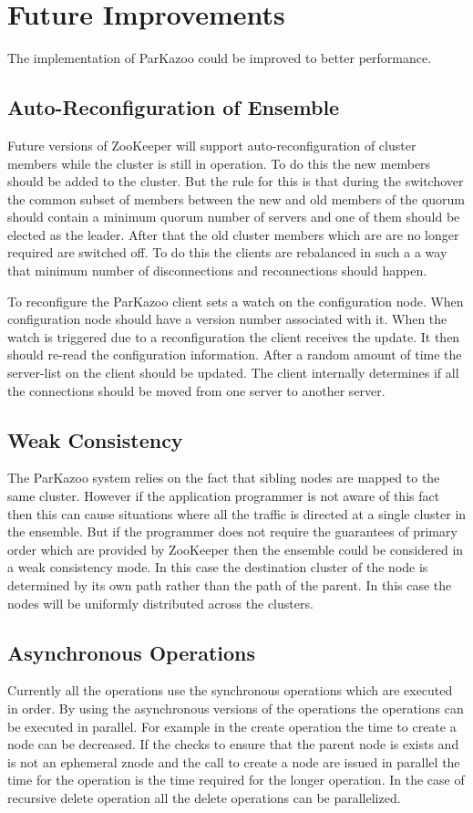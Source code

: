 \chapter{Future Improvements}
The implementation of ParKazoo could be improved to better performance. 

\section{Auto-Reconfiguration of Ensemble}
Future versions of ZooKeeper will support auto-reconfiguration of cluster members while the cluster is still in operation. To do this the new members should be added to the cluster. But the rule for this is that during the switchover the common subset of members between the new and old members of the quorum should contain a minimum quorum number of servers and one of them should be elected as the leader. After that the old cluster members which are are no longer required are switched off. To do this the clients are rebalanced in such a a way that minimum number of disconnections and reconnections should happen. 

To reconfigure the ParKazoo client sets a watch on the configuration node. When configuration node should have a version number associated with it. When the watch is triggered due to a reconfiguration the client receives the update. It then should re-read the configuration information. After a random amount of time the server-list on the client should be updated. The client internally determines if all the connections should be moved from one server to another server.

\section{Weak Consistency}
The ParKazoo system relies on the fact that sibling nodes are mapped to the same cluster. However if the application programmer is not aware of this fact then this can cause situations where all the traffic is directed at a single cluster in the ensemble. But if the programmer does not require the guarantees of primary order which are provided by ZooKeeper then the ensemble could be considered in a weak consistency mode. In this case the destination cluster of the node is determined by its own path rather than the path of the parent. In this case the nodes will be uniformly distributed across the clusters.

\section{Asynchronous Operations}
Currently all the operations use the synchronous operations which are executed in order. By using the asynchronous versions of the operations the operations can be executed in parallel. For example in the create operation the time to create a node can be decreased. If the checks to ensure that the parent node is exists and is not an ephemeral znode and the call to create a node are issued in parallel the time for the operation is the time required for the longer operation. In the case of recursive delete operation all the delete operations can be parallelized.